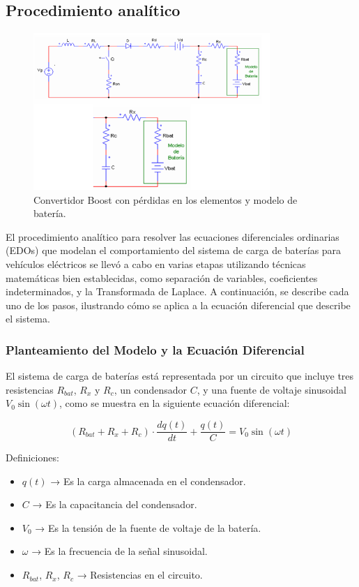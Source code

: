 \subsection{Procedimiento analítico}
\begin{figure}[h]
	\centering
	\includegraphics[width=0.8\textwidth]{4.png} %
	\caption{Convertidor Boost con pérdidas en los elementos y modelo de batería.}
	\label{fig:procedimiento}
\end{figure}

El procedimiento analítico para resolver las ecuaciones diferenciales ordinarias (EDOs) que modelan
el comportamiento del sistema de carga de baterías para vehículos eléctricos se llevó a cabo en varias
etapas utilizando técnicas matemáticas bien establecidas, como separación de variables, coeficientes
indeterminados, y la Transformada de Laplace. A continuación, se describe cada uno de los pasos,
ilustrando cómo se aplica a la ecuación diferencial que describe el sistema.

\subsubsection*{Planteamiento del Modelo y la Ecuación Diferencial}
El sistema de carga de baterías está representada por un circuito que incluye tres resistencias
\(R_{bat}\), \(R_x\) y \(R_c\), un condensador \(C\), y una fuente de voltaje sinusoidal \(V_0 \sin(\omega t)\), como se
muestra en la siguiente ecuación diferencial:

\[
	(R_{bat} + R_x + R_c) \cdot \frac{dq(t)}{dt} + \frac{q(t)}{C} = V_0 \sin(\omega t)
\]

Definiciones:
\begin{itemize}
	\item \(q(t)\) → Es la carga almacenada en el condensador.
	\item \(C\) → Es la capacitancia del condensador.
	\item \(V_0\) → Es la tensión de la fuente de voltaje de la batería.
	\item \(\omega\) → Es la frecuencia de la señal sinusoidal.
	\item \(R_{bat}\), \(R_x\), \(R_c\) → Resistencias en el circuito.
\end{itemize}

